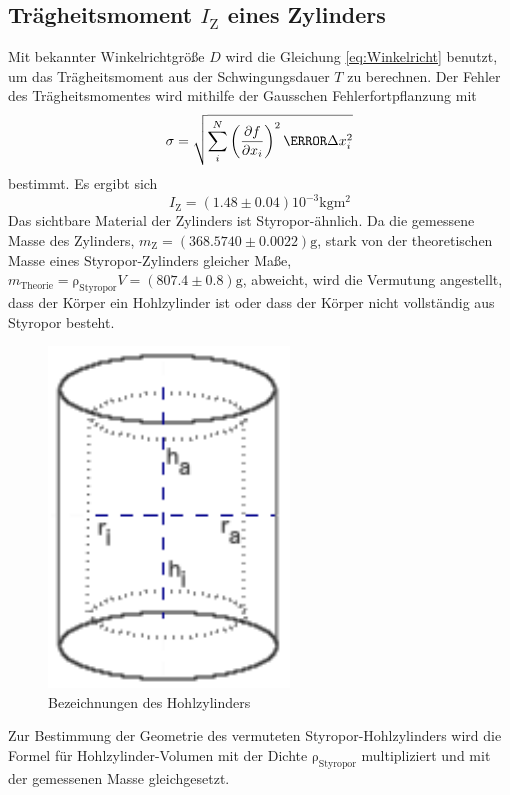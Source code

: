 \subsection{Trägheitsmoment $I_\text{Z}$ eines Zylinders}
\label{sub:traegheitsmoment_eines_zylinders}

\noindent Mit bekannter Winkelrichtgröße $D$ wird die Gleichung \eqref{eq:Winkelricht} benutzt, um das Trägheitsmoment aus der Schwingungsdauer $T$ zu berechnen. Der Fehler des Trägheitsmomentes wird mithilfe der Gausschen Fehlerfortpflanzung mit
\begin{equation}
	\label{eq:Gauss}
	\sigma=\sqrt{\sum_i^N{\left( \frac{\partial{f}}{\partial{x_i}}\right)^2\m \Delta x_i^2}}
\end{equation}bestimmt.
Es ergibt sich
\begin{equation}
	\label{wert:Zylinder}
	I_\text{Z} = (1.48\pm0.04)10^{-3} \si{\kilo\gram\meter\squared}
\end{equation}
Das sichtbare Material der Zylinders ist Styropor-ähnlich. \cite{dichte_styropor}
Da die gemessene Masse des Zylinders, $m_\text{Z} = (368.5740\pm0.0022) \si{\gram}$, stark von der theoretischen Masse eines Styropor-Zylinders gleicher Maße, $m_\text{Theorie} = \mathup{\rho_{\text{Styropor}}}V=(807.4\pm0.8) \si{\gram}$, abweicht, 
wird die Vermutung angestellt, dass der Körper ein Hohlzylinder ist oder dass der Körper nicht vollständig aus Styropor besteht.
\begin{figure}[b]
	\label{fig:tonne}
	\centering
	\includegraphics[scale=0.5]{Bilder/Tonne.pdf}
	\caption{Bezeichnungen des Hohlzylinders}
\end{figure}
Zur Bestimmung der Geometrie des vermuteten Styropor-Hohlzylinders wird die Formel für Hohlzylinder-Volumen mit der Dichte $\mathup{\rho_{\text{Styropor}}}$ multipliziert und mit der gemessenen Masse gleichgesetzt. 
